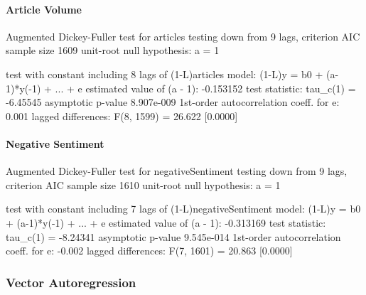 \paragraph{Article Volume}

Augmented Dickey-Fuller test for articles
testing down from 9 lags, criterion AIC
sample size 1609
unit-root null hypothesis: a = 1

test with constant 
including 8 lags of (1-L)articles
model: (1-L)y = b0 + (a-1)*y(-1) + ... + e
estimated value of (a - 1): -0.153152
test statistic: tau\_c(1) = -6.45545
asymptotic p-value 8.907e-009
1st-order autocorrelation coeff. for e: 0.001
lagged differences: F(8, 1599) = 26.622 [0.0000]

\paragraph{Negative Sentiment}

Augmented Dickey-Fuller test for negativeSentiment
testing down from 9 lags, criterion AIC
sample size 1610
unit-root null hypothesis: a = 1

test with constant 
including 7 lags of (1-L)negativeSentiment
model: (1-L)y = b0 + (a-1)*y(-1) + ... + e
estimated value of (a - 1): -0.313169
test statistic: tau\_c(1) = -8.24341
asymptotic p-value 9.545e-014
1st-order autocorrelation coeff. for e: -0.002
lagged differences: F(7, 1601) = 20.863 [0.0000]

\subsubsection{Vector Autoregression}

